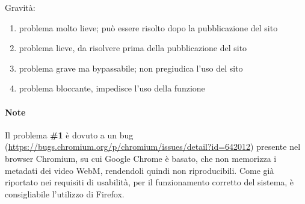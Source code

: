 Gravità:
	\begin{enumerate}
		\item problema molto lieve; può essere risolto dopo la pubblicazione 
		del sito
		\item problema lieve, da risolvere prima della pubblicazione del sito
		\item problema grave ma bypassabile; non pregiudica l'uso del sito
		\item problema bloccante, impedisce l'uso della funzione
	\end{enumerate}

\paragraph{Note} Il problema \textbf{\#1} è dovuto a un bug 
(\url{https://bugs.chromium.org/p/chromium/issues/detail?id=642012}) presente 
nel 
browser Chromium, su cui Google Chrome è basato, che non memorizza i metadati 
dei video WebM, rendendoli quindi non riproducibili. Come 
già riportato nei requisiti di usabilità, per il funzionamento corretto del 
sistema, è consigliabile l'utilizzo di Firefox.
